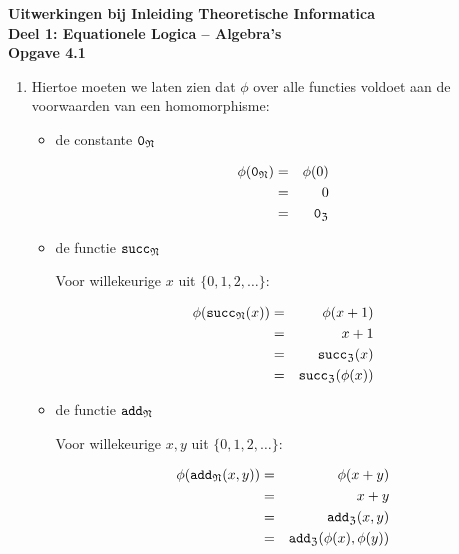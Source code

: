 \documentclass[a4paper,11pt]{article}
\begin{document}
{\bf Uitwerkingen bij Inleiding Theoretische Informatica\\
Deel 1: Equationele Logica -- Algebra's}\\[2em]


{\bf Opgave 4.1}

\begin{enumerate}

\item %
Hiertoe moeten we laten zien dat $\phi$ over alle functies voldoet aan de
voorwaarden van een homomorphisme:

\begin{itemize}

\item{de constante $\verb|0|_{\mathfrak{N}}$}

  \begin{eqnarray*}
    \phi(\verb|0|_{\mathfrak{N}}) & = & \phi(0) \\
                                  & = & 0 \\
                                  & = & \verb|0|_{\mathfrak{Z}}
  \end{eqnarray*}

\item{de functie $\verb|succ|_{\mathfrak{N}}$}

  Voor willekeurige $x$ uit $\{0,1,2,\ldots\}$:

  \begin{eqnarray*}
    \phi(\verb|succ|_{\mathfrak{N}}(x)) & = & \phi(x+1) \\
                                        & = & x+1 \\
                                        & = & \verb|succ|_{\mathfrak{Z}}(x) \\
                                        & = & \verb|succ|_{\mathfrak{Z}}(\phi(x))
  \end{eqnarray*}

\item{de functie $\verb|add|_{\mathfrak{N}}$}

  Voor willekeurige $x,y$ uit $\{0,1,2,\ldots\}$:

  \begin{eqnarray*}
    \phi(\verb|add|_{\mathfrak{N}}(x,y)) & = & \phi(x+y) \\
                                         & = & x+y \\
                                         & = & \verb|add|_{\mathfrak{Z}}(x,y) \\
                                         & = &
                                         \verb|add|_{\mathfrak{Z}}(\phi(x),\phi(y))
  \end{eqnarray*}


\end{itemize}
\end{enumerate}
\end{document}
